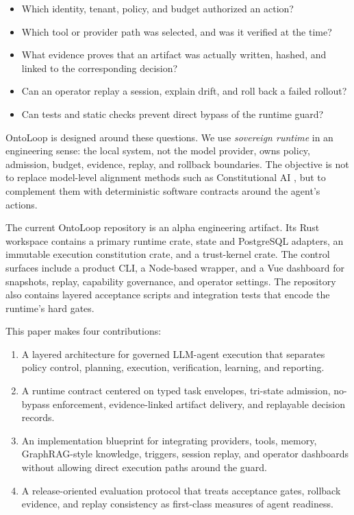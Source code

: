 \documentclass[11pt]{article}
\begin{document}
\begin{itemize}
  \item Which identity, tenant, policy, and budget authorized an action?
  \item Which tool or provider path was selected, and was it verified at the time?
  \item What evidence proves that an artifact was actually written, hashed, and
        linked to the corresponding decision?
  \item Can an operator replay a session, explain drift, and roll back a failed
        rollout?
  \item Can tests and static checks prevent direct bypass of the runtime guard?
\end{itemize}

OntoLoop is designed around these questions. We use \emph{sovereign runtime} in an
engineering sense: the local system, not the model provider, owns policy, admission,
budget, evidence, replay, and rollback boundaries. The objective is not to replace
model-level alignment methods such as Constitutional AI \cite{bai2022constitutional},
but to complement them with deterministic software contracts around the agent's
actions.

The current OntoLoop repository is an alpha engineering artifact. Its Rust workspace
contains a primary runtime crate, state and PostgreSQL adapters, an immutable
execution constitution crate, and a trust-kernel crate. The control surfaces include
a product CLI, a Node-based wrapper, and a Vue dashboard for snapshots, replay,
capability governance, and operator settings. The repository also contains layered
acceptance scripts and integration tests that encode the runtime's hard gates.

This paper makes four contributions:

\begin{enumerate}
  \item A layered architecture for governed LLM-agent execution that separates
        policy control, planning, execution, verification, learning, and reporting.
  \item A runtime contract centered on typed task envelopes, tri-state admission,
        no-bypass enforcement, evidence-linked artifact delivery, and replayable
        decision records.
  \item An implementation blueprint for integrating providers, tools, memory,
        GraphRAG-style knowledge, triggers, session replay, and operator dashboards
        without allowing direct execution paths around the guard.
  \item A release-oriented evaluation protocol that treats acceptance gates,
        rollback evidence, and replay consistency as first-class measures of agent
        readiness.
\end{enumerate}
\end{document}
